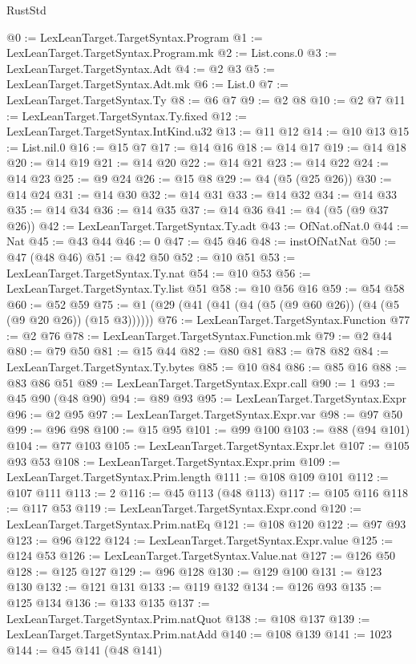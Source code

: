 \begin{lexlean}{RustStd}
\begin{coremodule}
@0 := LexLeanTarget.TargetSyntax.Program
@1 := LexLeanTarget.TargetSyntax.Program.mk
@2 := List.cons.{0}
@3 := LexLeanTarget.TargetSyntax.Adt
@4 := @2 @3
@5 := LexLeanTarget.TargetSyntax.Adt.mk
@6 := List.{0}
@7 := LexLeanTarget.TargetSyntax.Ty
@8 := @6 @7
@9 := @2 @8
@10 := @2 @7
@11 := LexLeanTarget.TargetSyntax.Ty.fixed
@12 := LexLeanTarget.TargetSyntax.IntKind.u32
@13 := @11 @12
@14 := @10 @13
@15 := List.nil.{0}
@16 := @15 @7
@17 := @14 @16
@18 := @14 @17
@19 := @14 @18
@20 := @14 @19
@21 := @14 @20
@22 := @14 @21
@23 := @14 @22
@24 := @14 @23
@25 := @9 @24
@26 := @15 @8
@29 := @4 (@5 (@25 @26))
@30 := @14 @24
@31 := @14 @30
@32 := @14 @31
@33 := @14 @32
@34 := @14 @33
@35 := @14 @34
@36 := @14 @35
@37 := @14 @36
@41 := @4 (@5 (@9 @37 @26))
@42 := LexLeanTarget.TargetSyntax.Ty.adt
@43 := OfNat.ofNat.{0}
@44 := Nat
@45 := @43 @44
@46 := 0
@47 := @45 @46
@48 := instOfNatNat
@50 := @47 (@48 @46)
@51 := @42 @50
@52 := @10 @51
@53 := LexLeanTarget.TargetSyntax.Ty.nat
@54 := @10 @53
@56 := LexLeanTarget.TargetSyntax.Ty.list @51
@58 := @10 @56 @16
@59 := @54 @58
@60 := @52 @59
@75 := @1 (@29 (@41 (@41 (@4 (@5 (@9 @60 @26)) (@4 (@5 (@9 @20 @26)) (@15 @3))))))
@76 := LexLeanTarget.TargetSyntax.Function
@77 := @2 @76
@78 := LexLeanTarget.TargetSyntax.Function.mk
@79 := @2 @44
@80 := @79 @50
@81 := @15 @44
@82 := @80 @81
@83 := @78 @82
@84 := LexLeanTarget.TargetSyntax.Ty.bytes
@85 := @10 @84
@86 := @85 @16
@88 := @83 @86 @51
@89 := LexLeanTarget.TargetSyntax.Expr.call
@90 := 1
@93 := @45 @90 (@48 @90)
@94 := @89 @93
@95 := LexLeanTarget.TargetSyntax.Expr
@96 := @2 @95
@97 := LexLeanTarget.TargetSyntax.Expr.var
@98 := @97 @50
@99 := @96 @98
@100 := @15 @95
@101 := @99 @100
@103 := @88 (@94 @101)
@104 := @77 @103
@105 := LexLeanTarget.TargetSyntax.Expr.let
@107 := @105 @93 @53
@108 := LexLeanTarget.TargetSyntax.Expr.prim
@109 := LexLeanTarget.TargetSyntax.Prim.length
@111 := @108 @109 @101
@112 := @107 @111
@113 := 2
@116 := @45 @113 (@48 @113)
@117 := @105 @116
@118 := @117 @53
@119 := LexLeanTarget.TargetSyntax.Expr.cond
@120 := LexLeanTarget.TargetSyntax.Prim.natEq
@121 := @108 @120
@122 := @97 @93
@123 := @96 @122
@124 := LexLeanTarget.TargetSyntax.Expr.value
@125 := @124 @53
@126 := LexLeanTarget.TargetSyntax.Value.nat
@127 := @126 @50
@128 := @125 @127
@129 := @96 @128
@130 := @129 @100
@131 := @123 @130
@132 := @121 @131
@133 := @119 @132
@134 := @126 @93
@135 := @125 @134
@136 := @133 @135
@137 := LexLeanTarget.TargetSyntax.Prim.natQuot
@138 := @108 @137
@139 := LexLeanTarget.TargetSyntax.Prim.natAdd
@140 := @108 @139
@141 := 1023
@144 := @45 @141 (@48 @141)

\end{coremodule}
\end{lexlean}
